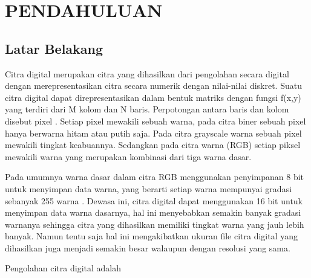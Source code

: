 
\chapter{PENDAHULUAN}

\section{Latar Belakang}
Citra digital merupakan citra yang dihasilkan dari pengolahan secara digital dengan merepresentasikan citra secara numerik dengan nilai-nilai diskret. Suatu citra digital dapat direpresentasikan dalam bentuk matriks dengan fungsi f(x,y) yang terdiri dari M kolom dan N baris. Perpotongan antara baris dan kolom disebut pixel . Setiap pixel mewakili sebuah warna, pada citra biner sebuah pixel hanya berwarna hitam atau putih saja. Pada citra grayscale warna sebuah pixel mewakili tingkat keabuannya. Sedangkan pada citra warna (RGB) setiap piksel mewakili warna yang merupakan kombinasi dari tiga warna dasar.

Pada umumnya warna dasar dalam citra RGB menggunakan penyimpanan 8 bit untuk menyimpan data warna, yang berarti setiap warna mempunyai gradasi sebanyak 255 warna . Dewasa ini, citra digital dapat menggunakan 16 bit untuk menyimpan data warna dasarnya, hal ini menyebabkan semakin banyak gradasi warnanya sehingga citra yang dihasilkan memiliki tingkat warna yang jauh lebih banyak. Namun tentu saja hal ini mengakibatkan ukuran file citra digital yang dihasilkan juga menjadi semakin besar walaupun dengan resolusi yang sama.

Pengolahan citra digital adalah




